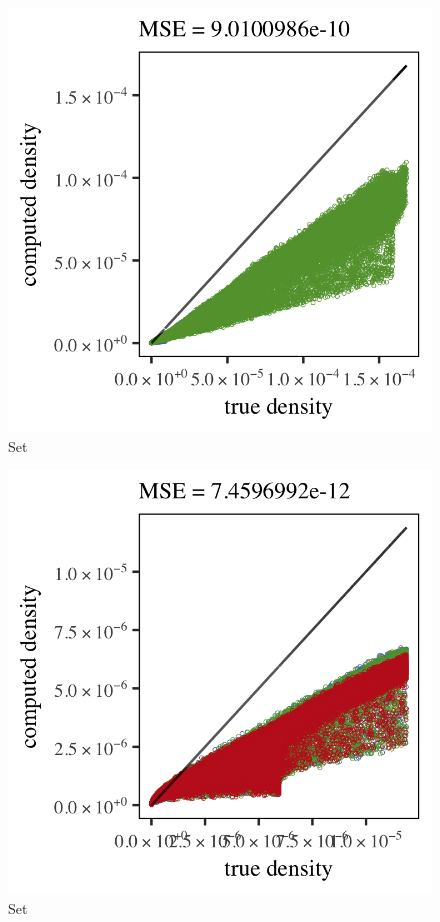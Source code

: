 \begin{subfigure}{0.3\textwidth}
	\centering
	\includegraphics[keepaspectratio=true, width=\textwidth, height=0.23\textheight]{4/img/results_ferdosi_4_600000_mbe_silverman}
	\caption{Set \ferdosiFour}
	\label{fig:4:simulated:datasets:mbe:ferdosi4}
\end{subfigure}
\begin{subfigure}{0.3\textwidth}
	\centering
	\includegraphics[keepaspectratio=true, width=\textwidth, height=0.23\textheight]{4/img/results_ferdosi_5_600000_mbe_silverman}
	\caption{Set \ferdosiFive}
	\label{fig:4:simulated:datasets:mbe:ferdosi5}
\end{subfigure}	